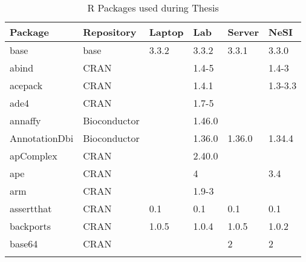 \begin{longtable}{|llllll|}
\caption{R Packages used during Thesis}
\label{tab:computers_r_packages_full}
\\
\multicolumn{1}{l}{\bfseries Package}  & \multicolumn{1}{l}{\bfseries Repository}  & \multicolumn{1}{l}{\bfseries Laptop}      & \multicolumn{1}{l}{\bfseries Lab}         & \multicolumn{1}{l}{\bfseries Server}         & \multicolumn{1}{l}{\bfseries NeSI} \\ \hline \rowcolor{gray!25}
base                          & base                      & 3.3.2       & 3.3.2       & 3.3.1          & 3.3.0            \\ \hline
abind                         & CRAN                      &             & 1.4-5       &                & 1.4-3             \\ \hline \rowcolor{gray!25}
acepack                       & CRAN                      &             & 1.4.1       &                & 1.3-3.3          \\ \hline
ade4                          & CRAN                      &             & 1.7-5       &                &                   \\ \hline \rowcolor{gray!25}
annaffy                       & Bioconductor              &             & 1.46.0      &                &                  \\ \hline
AnnotationDbi                 & Bioconductor              &             & 1.36.0      & 1.36.0         & 1.34.4            \\ \hline \rowcolor{gray!25}
apComplex                     & CRAN                      &             & 2.40.0      &                &                  \\ \hline
ape                           & CRAN                      &             & 4           &                & 3.4               \\ \hline \rowcolor{gray!25}
arm                           & CRAN                      &             & 1.9-3       &                &                  \\ \hline
assertthat                    & CRAN                      & 0.1         & 0.1         & 0.1            & 0.1               \\ \hline \rowcolor{gray!25}
backports                     & CRAN                      & 1.0.5       & 1.0.4       & 1.0.5          & 1.0.2            \\ \hline
base64                        & CRAN                      &             &             & 2              & 2                 \\ \hline \rowcolor{gray!25}

\end{longtable}
